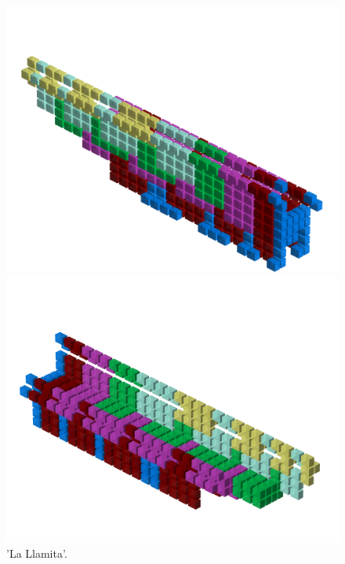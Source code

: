 \begin{figure}[H]
    \centering
    \begin{adjustbox}{width=12cm,center}
      \includegraphics[width=12cm]{src/patterns/pattern2-45.png}%
    \end{adjustbox}
    \begin{adjustbox}{width=12cm,margin=0cm -4cm}
      \includegraphics[width=12cm]{src/patterns/pattern2-225.png}%
    \end{adjustbox}
\caption{'La Llamita'.}
\end{figure}
\clearpage

